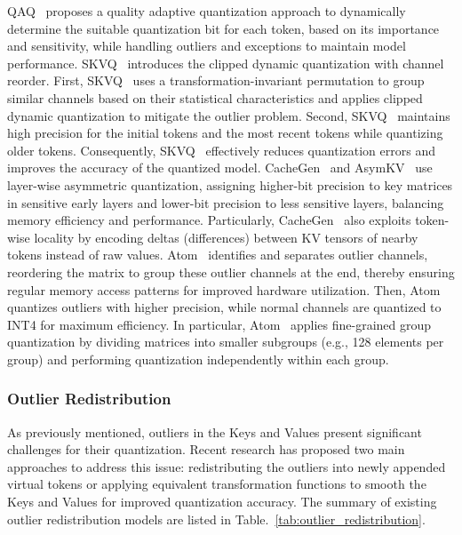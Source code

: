QAQ~\cite{dong2024qaq} proposes a quality adaptive quantization approach to dynamically determine the suitable quantization bit for each token, based on its importance and sensitivity, while handling outliers and exceptions to maintain model performance.
SKVQ~\cite{duanmu2024skvq} introduces the clipped dynamic quantization with channel reorder. First,  SKVQ~\cite{duanmu2024skvq} uses a transformation-invariant permutation to group similar channels based on their statistical characteristics and applies clipped dynamic quantization to mitigate the outlier problem. Second,  SKVQ~\cite{duanmu2024skvq} maintains high precision for the initial tokens and the most recent tokens while quantizing older tokens. Consequently, SKVQ~\cite{duanmu2024skvq} effectively reduces quantization errors and improves the accuracy of the quantized model.
CacheGen~\cite{liu2024cachegen} and AsymKV~\cite{tao2024asymkv} use layer-wise asymmetric quantization, assigning higher-bit precision  to key matrices in sensitive early layers and lower-bit precision  to less sensitive layers, balancing memory efficiency and performance.
Particularly,
CacheGen~\cite{liu2024cachegen}  also exploits token-wise locality by encoding deltas (differences) between KV tensors of nearby tokens instead of raw values.
Atom~\cite{zhao2024atom} identifies and separates outlier channels, reordering the matrix to group these outlier channels at the end, thereby ensuring regular memory access patterns for improved hardware utilization.
Then, Atom~\cite{zhao2024atom} quantizes outliers with higher precision, while normal channels are quantized to INT4 for maximum efficiency. 
In particular, Atom~\cite{zhao2024atom} applies fine-grained group quantization by dividing matrices into smaller subgroups (e.g., 128 elements per group) and performing quantization independently within each group.







\subsubsection{Outlier Redistribution }\label{sssec:outlier_redistribution}
As previously mentioned, outliers in the Keys and Values present significant challenges for their quantization. Recent research has proposed two main approaches to address this issue: redistributing the outliers into newly appended virtual tokens or applying equivalent transformation functions to smooth the Keys and Values for improved quantization accuracy.
The summary of existing outlier redistribution models are listed in Table.~\ref{tab:outlier_redistribution}.


